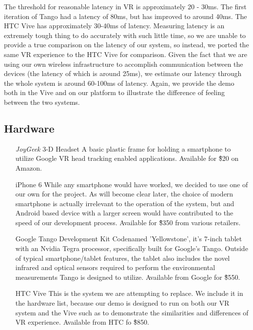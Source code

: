 \documentclass{report}
\begin{document}
	The threshold for reasonable latency in VR is approximately 20 - 30ms. The first iteration of Tango had a latency of 80ms, but has improved to around 40ms. The HTC Vive has approximately 30-40ms of latency. Measuring latency is an extremely tough thing to do accurately with such little time, so we are unable to provide a true comparison on the latency of our system, so instead, we ported the same VR experience to the HTC Vive for comparison. Given the fact that we are using our own wireless infrastructure to accomplish communication between the devices (the latency of which is around 25ms), we estimate our latency through the whole system is around 60-100ms of latency. Again, we provide the demo both in the Vive and on our platform to illustrate the difference of feeling between the two systems.
	
	\subsection*{Hardware}
	\begin{itemize}
		\item[\textit{JoyGeek} 3-D Headset] A basic plastic frame for holding a smartphone to utilize Google VR head tracking enabled applications. Available for \~\$20 on Amazon.
		\item[iPhone 6] While any smartphone would have worked, we decided to use one of our own for the project. As will become clear later, the choice of modern smartphone is actually irrelevant to the operation of the system, but and Android based device with a larger screen would have contributed to the speed of our development process. Available for \~\$350 from various retailers.
		\item[Google Tango Development Kit] Codenamed 'Yellowstone', it's 7-inch tablet with an Nvidia Tegra processor, specifically built for Google's Tango. Outside of typical smartphone/tablet features, the tablet also includes the novel infrared and optical sensors required to perform the environmental measurements Tango is designed to utilize. Available from Google for \~\$550.
		\item[HTC Vive] This is the system we are attempting to replace. We include it in the hardware list, because our demo is designed to run on both our VR system and the Vive such as to demonstrate the similarities and differences of VR experience. Available from HTC fo \~\$850.
	\end{itemize}
	
\end{document}
